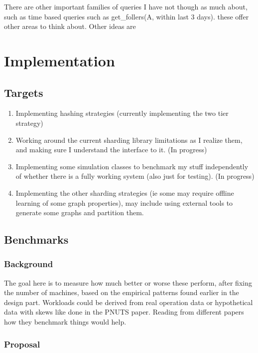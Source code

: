 \documentclass[draft]{article}
\begin{document}
There are other important families of queries I have not though as much about, such as time based queries such as get\_follers(A, within last 3 days).  these offer other areas to think about. Other ideas are 

\section{Implementation}
\subsection{Targets}

\begin{enumerate}
\item Implementing hashing strategies (currently implementing the two tier strategy)
\item Working around the current sharding library limitations as I realize them, and making sure  I understand the interface to it. (In progress)
\item Implementing some simulation classes to benchmark my stuff  independently of whether there is a fully working system (also just for testing). (In progress)
\item Implementing the other sharding strategies (ie some may require offline learning of some graph properties), may include using external tools to generate some graphs and partition them.

\end{enumerate}

\subsection{Benchmarks}
\subsubsection{Background}
The goal here is to measure how much better or worse these perform, after fixing the number of machines, based on the empirical patterns found earlier in the design part.  Workloads could be derived from real operation data or hypothetical data with skews like done in the PNUTS paper. Reading from different papers how they benchmark things would help.
\subsubsection{Proposal}
\end{document}
